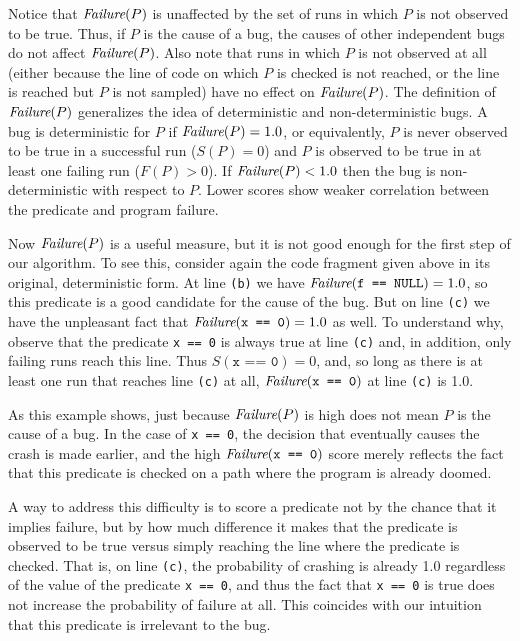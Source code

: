 Notice that $\textit{Failure}(P)$ is unaffected by the set of runs in which
$P$ is not observed to be true.  Thus, if $P$ is the cause of a bug, the
causes of other independent bugs do not affect $\textit{Failure}(P)$.
Also note that runs in which $P$ is not observed at all (either because
the line of code on which $P$ is checked is not reached, or the line is reached
but $P$ is not sampled) have no effect on $\textit{Failure}(P)$.
The definition of $\textit{Failure}(P)$
generalizes the idea of deterministic and non-deterministic bugs.  A
bug is deterministic for $P$ if $\textit{Failure}(P) = 1.0$, or equivalently,
$P$ is never observed to be true in a successful run ($S(P) =
0$) and $P$ is observed to be true in at least one failing run ($F(P) > 0$).
If $\textit{Failure}(P) < 1.0$ then the bug is non-deterministic with respect to $P$.
Lower scores show weaker correlation between the predicate and
program failure.

Now $\textit{Failure}(P)$ is a useful measure, but it is not good
enough for the first step of our algorithm. To see this, consider again the
code fragment given above in its original, deterministic form.  At line \texttt{(b)} we
have $\textit{Failure}(\texttt{f == NULL}) = 1.0$, so this predicate is a good
candidate for the cause of the bug.
But on line \texttt{(c)} we have the unpleasant fact that $\textit{Failure}(\texttt{x == 0}) = 1.0$ as well.
To understand why, observe that the
predicate \texttt{x == 0} is always true at line \texttt{(c)} and, in
addition,
only failing runs reach this line.
Thus $S(\texttt{x == 0}) = 0$, and, so long as there is at least one run that
reaches line \texttt{(c)} at all, $\textit{Failure}(\texttt{x == 0})$ at line \texttt{(c)} is 1.0.

As this example
shows, just because $\textit{Failure}(P)$ is high does not
mean $P$ is the cause of a bug.  In the case of \texttt{x == 0}, the
decision that eventually causes the crash is made earlier, and the
high $\textit{Failure}(\texttt{x == 0})$ score merely reflects the fact that this
predicate is checked on a path where the program is already doomed.

A way to address this difficulty is to score a predicate not by the chance
that it implies failure, but by how much difference it makes that the predicate
is observed to be true versus simply reaching the line where the predicate is checked.
That is, on line \texttt{(c)}, the probability of crashing is already 1.0 regardless
of the value of the predicate \texttt{x == 0}, and thus the fact that \texttt{x == 0} is
true does not increase the probability of failure at all.  This coincides with
our intuition that this predicate is irrelevant to the bug.

